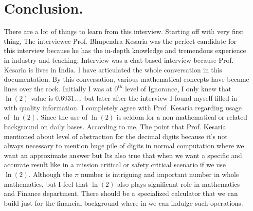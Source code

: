\documentclass{article}
\begin{document}
\newpage
\section{Conclusion.}
\quad \quad \quad There are a lot of things to learn from this interview. Starting off with very first thing, The interviewee Prof. Bhupendra Kesaria was the perfect candidate for this interview because he has the in-depth knowledge and tremendous experience in industry and teaching. Interview was a chat based interview because Prof. Kesaria is lives in India. I have articulated the whole conversation in this documentation. By this conversation, various mathematical concepts have became lines over the rock. Initially I was at $0^{th}$ level of Ignorance, I only knew that $\ln(2)$ value is 0.6931..., but later after the interview I found myself filled in with quality information. I completely agree with Prof. Kesaria regarding usage of $\ln(2)$. Since the use of $\ln(2)$ is seldom for a non mathematical or related background on daily bases.
\newline
According to me, The point that Prof. Kesaria mentioned about level of abstraction for the decimal digits because it's not always necessary to mention huge pile of digits in normal computation where we want an approximate answer but Its also true that when we want a specific and accurate result like in a mission critical or safety critical scenario if we use $\ln(2)$.
\newline
Although the $\pi$ number is intriguing and important number in whole mathematics, but I feel that $\ln(2)$ also plays significant role in mathematics and Finance department. There should be a specialized calculator that we can build just for the financial background where in we can indulge such operations.
\end{document}
